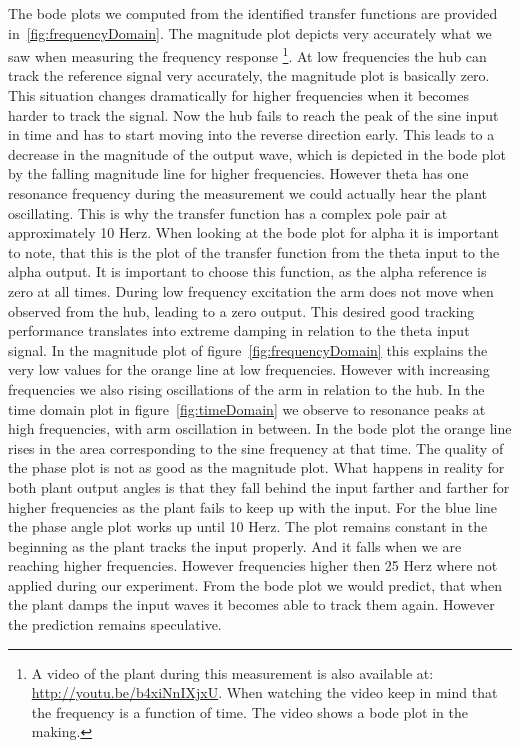 \documentclass[ twoside,openright,titlepage,numbers=noenddot,headinclude,%
                footinclude=true,cleardoublepage=empty,abstractoff, %
                BCOR=5mm,paper=a4,fontsize=11pt,%
                ngerman,american,%
                ]{scrreprt}
\begin{document}
The bode plots we computed from the identified transfer functions are provided in~\ref{fig:frequencyDomain}. The magnitude plot depicts very accurately what we saw when measuring the frequency response \footnote{A video of the plant during this measurement is also available at: \url{http://youtu.be/b4xiNnIXjxU}. When watching the video keep in mind that the frequency is a function of time. The video shows a bode plot in the making.}. At low frequencies the hub can track the reference signal very accurately, the magnitude plot is basically zero. This situation changes dramatically for higher frequencies when it becomes harder to track the signal. Now the hub fails to reach the peak of the sine input in time and has to start moving into the reverse direction early. This leads to a decrease in the magnitude of the output wave, which is depicted in the bode plot by the falling magnitude line for  higher frequencies. However theta has one resonance frequency during the measurement we could actually hear the plant oscillating. This is why the transfer function has a complex pole pair at approximately 10 Herz. 
When looking at the bode plot for alpha it is important to note, that this is the plot of the transfer function from the theta input to the alpha output. It is important to choose this function, as the alpha reference is zero at all times. During low frequency excitation the arm does not move when observed from the hub, leading to a zero output. This desired good tracking performance translates into extreme damping in relation to the theta input signal. In the magnitude plot of figure~\ref{fig:frequencyDomain} this explains the very low values for the orange line at low frequencies. However with increasing frequencies we also rising oscillations of the arm in relation to the hub. In the time domain plot in figure~\ref{fig:timeDomain} we observe to resonance peaks at high frequencies, with arm oscillation in between. In the bode plot the orange line rises in the area corresponding to the sine frequency at that time. 
The quality of the phase plot is not as good as the magnitude plot. What happens in reality for both plant output angles is that they fall behind the input farther and farther for higher frequencies as the plant fails to keep up with the input. For the blue line the phase angle plot works up until 10 Herz. The plot remains constant in the beginning as the plant tracks the input properly. And it falls when we are reaching higher frequencies. However frequencies higher then 25 Herz where not applied during our experiment. From the bode plot we would predict, that when the plant damps the input waves it becomes able to track them again. However the prediction remains speculative.   
\end{document}
